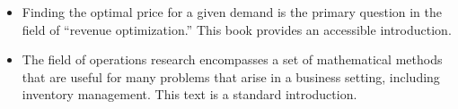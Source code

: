 \begin{itemize}
\item {}
  Finding the optimal price for a given demand is the primary question
  in the field of ``revenue optimization.'' This book provides an
  accessible introduction.

\item {}
  The field of operations research encompasses a set of mathematical
  methods that are useful for many problems that arise in a business
  setting, including inventory management. This text is a standard
  introduction.
\end{itemize}

